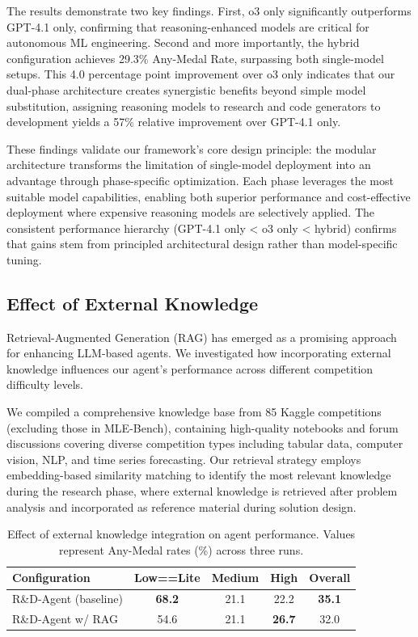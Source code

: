 The results demonstrate two key findings. First, o3 only significantly outperforms GPT-4.1 only, confirming that reasoning-enhanced models are critical for autonomous ML engineering. Second and more importantly, the hybrid configuration achieves 29.3\% Any-Medal Rate, surpassing both single-model setups. This 4.0 percentage point improvement over o3 only indicates that our dual-phase architecture creates synergistic benefits beyond simple model substitution, assigning reasoning models to research and code generators to development yields a 57\% relative improvement over GPT-4.1 only.

These findings validate our framework's core design principle: the modular architecture transforms the limitation of single-model deployment into an advantage through phase-specific optimization. Each phase leverages the most suitable model capabilities, enabling both superior performance and cost-effective deployment where expensive reasoning models are selectively applied. The consistent performance hierarchy (GPT-4.1 only < o3 only < hybrid) confirms that gains stem from principled architectural design rather than model-specific tuning.

\subsection{Effect of External Knowledge}

Retrieval-Augmented Generation (RAG) has emerged as a promising approach for enhancing LLM-based agents. We investigated how incorporating external knowledge influences our agent's performance across different competition difficulty levels.

We compiled a comprehensive knowledge base from 85 Kaggle competitions (excluding those in MLE-Bench), containing high-quality notebooks and forum discussions covering diverse competition types including tabular data, computer vision, NLP, and time series forecasting. Our retrieval strategy employs embedding-based similarity matching to identify the most relevant knowledge during the research phase, where external knowledge is retrieved after problem analysis and incorporated as reference material during solution design.

\begin{table}[htbp]
\centering
\caption{Effect of external knowledge integration on agent performance. Values represent Any-Medal rates (\%) across three runs.}
\label{tab:rag_effect}
\renewcommand{\arraystretch}{1.2}
\begin{tabular}{lcccc}
\toprule
\textbf{Configuration} & \textbf{Low==Lite} & \textbf{Medium} & \textbf{High} & \textbf{Overall} \\
\midrule
R\&D-Agent (baseline)  & \textbf{68.2} & 21.1 & 22.2 & \textbf{35.1} \\
R\&D-Agent w/ RAG & 54.6 & 21.1 & \textbf{26.7} & 32.0 \\
\bottomrule
\end{tabular}
\end{table}


